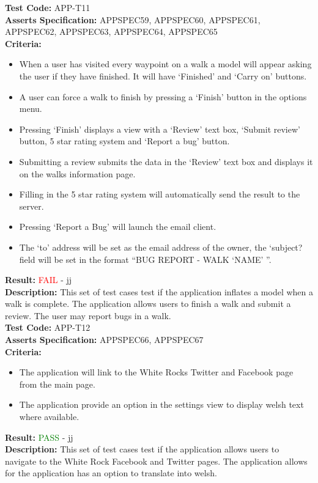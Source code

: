\documentclass[11pt,a4paper]{report}
\begin{document}
\label{test:APP-T11}
\noindent\textbf{Test Code:} APP-T11\\
\textbf{Asserts Specification:} APPSPEC59, APPSPEC60, APPSPEC61, APPSPEC62, APPSPEC63, APPSPEC64, APPSPEC65\\ 
\textbf{Criteria:} \begin{itemize}
                     \item When a user has visited every waypoint on a walk a model will appear asking the user if they have finished. It will have `Finished' and `Carry on' buttons.
                     \item A user can force a walk to finish by pressing a `Finish' button in the options menu.
                     \item Pressing `Finish' displays a view with a `Review' text box, `Submit review' button, 5 star rating system and `Report a bug' button.
                     \item Submitting a review submits the data in the `Review' text box and displays it on the walks information page.
                     \item Filling in the 5 star rating system will automatically send the result to the server.
                     \item Pressing `Report a Bug' will launch the email client.
                     \item The `to' address will be set as the email address of the owner, the `subject? field will be set in the format ``BUG REPORT - WALK `NAME' ''.
                   \end{itemize}
\textbf{Result:} \textcolor{red}{FAIL} - jj\\
\textbf{Description:} This set of test cases test if the application inflates a model when a walk is complete. The application allows users to finish a walk and submit a review. The user may report bugs in a walk.\\

\label{test:APP-T12}
\noindent\textbf{Test Code:} APP-T12\\
\textbf{Asserts Specification:} APPSPEC66, APPSPEC67\\ 
\textbf{Criteria:} \begin{itemize}
                     \item The application will link to the White Rocks Twitter and Facebook page from the main page.
                     \item The application provide an option in the settings view to display welsh text where available.
                   \end{itemize}
\textbf{Result:} \textcolor{green}{PASS} - jj\\
\textbf{Description:} This set of test cases test if the application allows users to navigate to the White Rock Facebook and Twitter pages. The application allows for the application has an option to translate into welsh.
\end{document}
